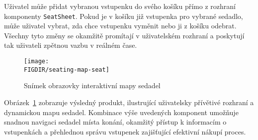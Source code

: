 Uživatel může přidat vybranou vstupenku do svého košíku přímo z rozhraní komponenty \texttt{SeatSheet}.
Pokud je v košíku již vstupenka pro vybrané sedadlo, může uživatel vybrat, zda chce vstupenku vyměnit nebo ji z košíku odebrat.
Všechny tyto změny se okamžitě promítají v uživatelském rozhraní a poskytují tak uživateli zpětnou vazbu v reálném čase.

\begin{figure}[h]
    \centering
    \texttt{[image: \\FIGDIR/seating-map-seat]}
    \caption{Snímek obrazovky interaktivní mapy sedadel}
    \label{fig:seating-map-seat}
\end{figure}

Obrázek~\ref{fig:seating-map-seat} zobrazuje výsledný produkt, ilustrující uživatelsky přívětivé rozhraní a dynamickou mapu sedadel.
Kombinace výše uvedených komponent umožňuje snadnou navigaci sedadel místa konání, okamžitý přístup k informacím o vstupenkách a přehlednou správu vstupenek zajišťující efektivní nákupí proces.
